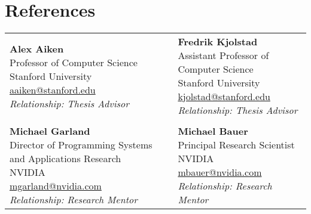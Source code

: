 \documentclass[10pt,a4paper,sans]{moderncv}        %
\begin{document}
\section{References}
\small{
    \begin{tabular}{p{10cm}p{10cm}}
        \makecell[l]{ \textbf{Alex Aiken} \\
   Professor of Computer Science \\
   Stanford University \\
   \href{mailto:aaiken@stanford.edu}{aaiken@stanford.edu}\\
   \textit{Relationship: Thesis Advisor}}  &
   \makecell[l]{ \textbf{Fredrik Kjolstad} \\
   Assistant Professor of Computer Science \\
   Stanford University \\
   \href{mailto:kjolstad@stanford.edu}{kjolstad@stanford.edu} \\
   \textit{Relationship: Thesis Advisor}}
   \\
   \\
   \makecell[l]{ \textbf{Michael Garland} \\
   Director of Programming Systems and Applications Research \\
   NVIDIA \\
   \href{mailto:mgarland@nvidia.com}{mgarland@nvidia.com}\\
   \textit{Relationship: Research Mentor}}
    &
    \makecell[l]{ \textbf{Michael Bauer} \\
   Principal Research Scientist  \\
   NVIDIA \\
   \href{mailto:mbauer@nvidia.com}{mbauer@nvidia.com}\\
   \textit{Relationship: Research Mentor}} \\
    \end{tabular}
}



\end{document}
